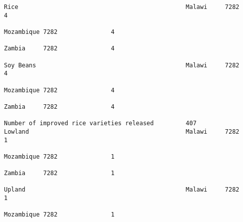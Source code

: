 \documentclass[11pt]{article}
\begin{document}
\begin{Verbatim}[commandchars=\\\{\}]
                                                                                                                                                              Rice                                               Malawi     7282               4  
                                                                                                                                                                                                                 Mozambique 7282               4  
                                                                                                                                                                                                                 Zambia     7282               4  
                                                                                                                                                              Soy Beans                                          Malawi     7282               4  
                                                                                                                                                                                                                 Mozambique 7282               4  
                                                                                                                                                                                                                 Zambia     7282               4  
                                                                         Number of improved rice varieties released         407                               Lowland                                            Malawi     7282               1  
                                                                                                                                                                                                                 Mozambique 7282               1  
                                                                                                                                                                                                                 Zambia     7282               1  
                                                                                                                                                              Upland                                             Malawi     7282               1  
                                                                                                                                                                                                                 Mozambique 7282               1  

\end{Verbatim}
\end{document}
